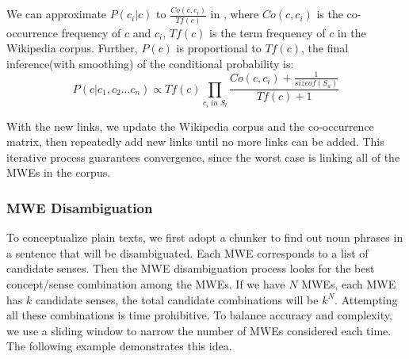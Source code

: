 We can approximate $P\left(c_i|c\right)$ to $\frac{Co\left(c,c_i\right)}{Tf\left(c\right)}$
in , where $Co\left(c,c_i\right)$ is the co-occurrence frequency
of $c$ and $c_i$, $Tf\left(c\right)$ is the term frequency of $c$ in the
Wikipedia corpus.
Further, $P\left(c\right)$ is proportional to $Tf\left(c\right)$, the final
inference(with smoothing) of the conditional probability is:
\begin{equation}
P\left( c|{ c }_{ 1 },{ c }_{ 2 }...{ c }_{ n } \right)\propto Tf\left( c \right) \prod _{ { c }_{ i } \;  in \;  { S }_{ l } }^{  }{ \frac { Co\left( c,{ c }_{ i } \right) +\frac { 1 }{ sizeof({ S }_{ u }) }  }{ Tf\left( c \right) +1 }  }
\end{equation}

With the new links, we update the Wikipedia corpus and the co-occurrence
matrix, then repeatedly add new links until no more links can be added.
This iterative process guarantees convergence, since the worst case is linking all of the MWEs in the corpus.


\subsubsection{MWE Disambiguation}
To conceptualize plain texts, we first adopt a chunker to find out noun phrases
in a sentence that will be disambiguated. Each MWE corresponds to a list of
candidate senses.
Then the MWE disambiguation process
looks for the best concept/sense combination among the MWEs.
If we have $N$ MWEs, each MWE has $k$ candidate senses,
the total candidate combinations will be $k^N$.
Attempting all these combinations is time prohibitive.
To balance accuracy and complexity, we use a sliding window to
narrow the number of MWEs considered each time.
The following example demonstrates this idea.

